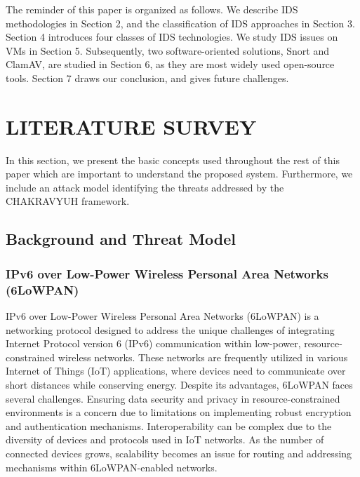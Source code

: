 \documentclass[letterpaper, 10 pt, conference]{ieeeconf}  %
\begin{document}
The reminder of this paper is organized as follows. We describe IDS methodologies in Section 2, and the classification of IDS approaches in Section 3. Section 4 introduces four classes of IDS technologies. We study IDS issues on VMs in Section 5. Subsequently, two software-oriented solutions, Snort and ClamAV, are studied in Section 6, as they are most widely used open-source tools. Section 7 draws our conclusion, and gives future challenges.



\section{LITERATURE SURVEY}
In this section, we present the basic concepts used throughout the rest of this paper which are important to understand the proposed system. Furthermore, we include an attack model identifying the threats addressed by the CHAKRAVYUH framework.

\subsection{Background and Threat Model}
\subsubsection{IPv6 over Low-Power Wireless Personal Area Networks (6LoWPAN)}
IPv6 over Low-Power Wireless Personal Area Networks (6LoWPAN) is a networking protocol designed to address the unique challenges of integrating Internet Protocol version 6 (IPv6) communication within low-power, resource-constrained wireless networks. These networks are frequently utilized in various Internet of Things (IoT) applications, where devices need to communicate over short distances while conserving energy. Despite its advantages, 6LoWPAN faces several challenges. Ensuring data security and privacy in resource-constrained environments is a concern due to limitations on implementing robust encryption and authentication mechanisms. Interoperability can be complex due to the diversity of devices and protocols used in IoT networks. As the number of connected devices grows, scalability becomes an issue for routing and addressing mechanisms within 6LoWPAN-enabled networks.\cite{c8}\\
\end{document}
